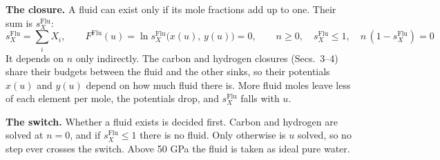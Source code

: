 \documentclass[11pt]{article}
\begin{document}
{\textbf{The closure.} A fluid can exist only if its mole fractions add up to one. Their sum is $s_X^{\mathrm{Flu}}$:
\begin{equation}
  s_X^{\mathrm{Flu}}=\sum_iX_i,\qquad F^{\mathrm{Flu}}(u)=\ln s_X^{\mathrm{Flu}}\big(x(u),\,y(u)\big)=0,\qquad n\ge0,\quad s_X^{\mathrm{Flu}}\le1,\quad n\,(1-s_X^{\mathrm{Flu}})=0
\end{equation}
It depends on $n$ only indirectly. The carbon and hydrogen closures (Secs.~3--4) share their budgets between the fluid and the other sinks, so their potentials $x(u)$ and $y(u)$ depend on how much fluid there is. More fluid moles leave less of each element per mole, the potentials drop, and $s_X^{\mathrm{Flu}}$ falls with $u$.

\textbf{The switch.} Whether a fluid exists is decided first. Carbon and hydrogen are solved at $n=0$, and if $s_X^{\mathrm{Flu}}\le1$ there is no fluid. Only otherwise is $u$ solved, so no step ever crosses the switch. Above 50 GPa the fluid is taken as ideal pure water.
}

\vspace*{\fill}
\clearpage
\end{document}
